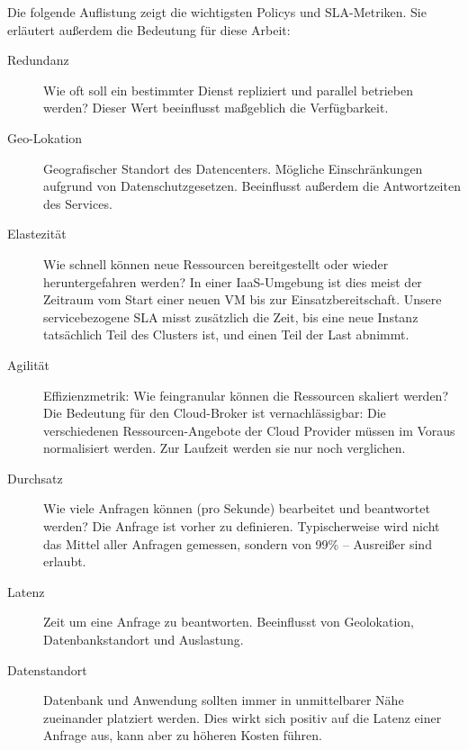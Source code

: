Die folgende Auflistung zeigt die wichtigsten Policys und SLA-Metriken. Sie erläutert außerdem die Bedeutung für diese Arbeit:

\begin{description}
	
	
	\item[Redundanz] Wie oft soll ein bestimmter Dienst repliziert und parallel betrieben werden? Dieser Wert beeinflusst maßgeblich die Verfügbarkeit.
	
	
	\item[Geo-Lokation] Geografischer Standort des Datencenters. Mögliche Einschränkungen aufgrund von Datenschutzgesetzen. Beeinflusst außerdem die Antwortzeiten des Services.
	
	\item[Elastezität] Wie schnell können neue Ressourcen bereitgestellt oder wieder heruntergefahren werden? In einer IaaS-Umgebung ist dies meist der Zeitraum vom Start einer neuen VM bis zur Einsatzbereitschaft. Unsere servicebezogene SLA misst zusätzlich die Zeit, bis eine neue Instanz tatsächlich Teil des Clusters ist, und einen Teil der Last abnimmt.
	
	\item[Agilität] Effizienzmetrik: Wie feingranular können die Ressourcen skaliert werden? Die Bedeutung für den Cloud-Broker ist vernachlässigbar: Die verschiedenen Ressourcen-Angebote der Cloud Provider müssen im Voraus normalisiert werden. Zur Laufzeit werden sie nur noch verglichen.
	
	\item[Durchsatz] Wie viele Anfragen können (pro Sekunde) bearbeitet und beantwortet werden? Die Anfrage ist vorher zu definieren. Typischerweise wird nicht das Mittel aller Anfragen gemessen, sondern von 99\% -- Ausreißer sind erlaubt.
	
	\item[Latenz] Zeit um eine Anfrage zu beantworten. Beeinflusst von Geolokation, Datenbankstandort und Auslastung.
	
	\item[Datenstandort] Datenbank und Anwendung sollten immer in unmittelbarer Nähe zueinander platziert werden. Dies wirkt sich positiv auf die Latenz einer Anfrage aus, kann aber zu höheren Kosten führen.
	

\end{description}

